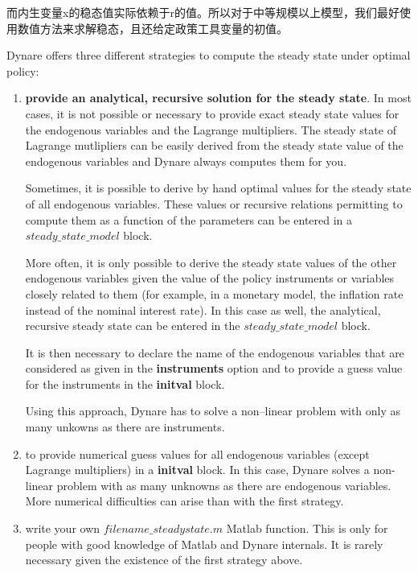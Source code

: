 \documentclass[10pt,math=newtx,citestyle=gb7714-2015,bibstyle=gb7714-2015]{elegantbook}
\begin{document}
{	而内生变量x的稳态值实际依赖于r的值。所以对于中等规模以上模型，我们最好使用数值方法来求解稳态，且还给定政策工具变量的初值。
	
	Dynare offers three different strategies to compute the steady state under optimal policy:
	
	\begin{enumerate}
		\item \textbf{provide an analytical, recursive solution for the steady state}. In most cases, it is not possible or necessary to provide exact steady state values for the endogenous variables and the Lagrange multipliers. The steady state of Lagrange mutlipliers can be easily derived from the steady state value of the endogenous variables and Dynare always computes them for you.
		
		Sometimes, it is possible to derive by hand optimal values for the steady state of all endogenous variables. These values or recursive relations permitting to compute them as a function of the parameters can be entered in a $steady\_state\_ model$ block.
		
		More often, it is only possible to derive the steady state values of the other endogenous variables given the value of the policy instruments or variables closely related to them (for example, in a monetary model, the inflation rate instead of the nominal interest rate). In this case as well, the analytical, recursive steady state can be entered in the $steady\_state\_ model$ block.
		
		It is then necessary to declare the name of the endogenous variables that are considered as given in the \textbf{instruments} option and to provide a guess value for the instruments in the \textbf{initval} block. 
		
		Using this approach, Dynare has to solve a non–linear problem with only as many unkowns as there are instruments.
		\item to provide numerical guess values for all endogenous variables (except Lagrange multipliers) in a \textbf{initval} block. In this case, Dynare solves a non-linear problem with as many unknowns as there are endogenous variables. More numerical difficulties can arise than with the first strategy.
		\item write your own $filename\_steadystate.m$ Matlab function. This is only for people with good knowledge of Matlab and Dynare internals. It is rarely necessary given the existence of the first strategy above.
	\end{enumerate}
	
}
\end{document}
